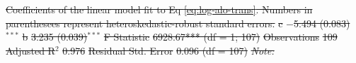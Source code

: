 \documentclass[fleqn,10pt,lineno]{wlpeerj} %
\providecommand{\DIFdel}[1]{{\protect\color{red}\sout{#1}}}                      %
\providecommand{\DIFdelbegin}{} %
\providecommand{\DIFdelFL}[1]{\DIFdel{#1}} %
\begin{document}
\DIFdelbegin %
{%
\DIFdelFL{Coefficients of the linear model fit to Eq \ref{eq:log-alo-trans}. Numbers in parenthesees represent heteroskedastic-robust standard errors.}} 
\DIFdelFL{c }%
\DIFdelFL{$-$5.494 (0.083)$^{***}$ }%
\DIFdelFL{b }%
\DIFdelFL{3.235 (0.039)$^{***}$ }%
\DIFdelFL{F Statistic }%
\DIFdelFL{6928.67*** (df = 1; 107) }%
\DIFdelFL{Observations }%
\DIFdelFL{109 }%
\DIFdelFL{Adjusted R$^{2}$ }%
\DIFdelFL{0.976 }%
\DIFdelFL{Residual Std. Error }%
\DIFdelFL{0.096 (df = 107) }%
\textit{\DIFdelFL{Note:}}  %
\end{document}
